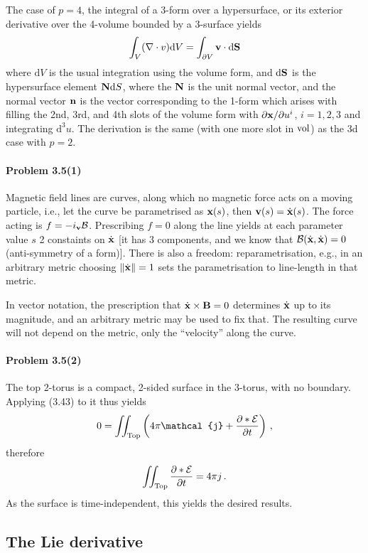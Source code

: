 \documentclass[a4paper,12pt]{article}
\def\d{\mathrm{d}}
\newcommand{\problem}[1]{\paragraph{Problem #1}}
\begin{document}
The case of $p=4$, the integral of a 3-form over a hypersurface, or its exterior derivative over the 4-volume bounded by a 3-surface yields
\[
 \int_{V}(\nabla \cdot v)\d V = \int_{\partial V}{\bf v}\cdot \d {\bf S}
\]
where $\d V$ is the usual integration using the volume form, and $\d{\bf S}$ is the hypersurface element ${\bf N}\d S$, where the ${\bf N}$ is the unit normal vector, and the normal vector ${\bf n}$ is the vector corresponding to the 1-form which arises with filling the 2nd, 3rd, and 4th slots of the volume form with $\partial{\bf x}/\partial u^i$, $i=1,2,3$ and integrating $\d^3 u$. The derivation is the same (with one more slot in ${\rm vol}$) as the 3d case with $p=2$.



\problem{3.5(1)} Magnetic field lines are curves, along which no magnetic force acts on a moving particle, i.e., let the curve be parametrised as ${\bf x}(s)$, then ${\bf v}(s) = \dot{\bf x}(s)$. The force acting is $f = -i_{\bf v}\mathcal{B}$. Prescribing $f=0$ along the line yields at each parameter value $s$ 2 constaints on $\dot{\bf x}$ [it has 3 components, and we know that $\mathcal{B}(\dot{\bf x}, \dot{\bf x})=0$ (anti-symmetry of a form)]. There is also a freedom: reparametrisation, e.g., in an arbitrary metric choosing $\|\dot{\bf x}\| =1$ sets the parametrisation to line-length in that metric.

In vector notation, the prescription that $\dot{\bf x}\times {\bf B} = 0$ determines $\dot{\bf x}$ up to its magnitude, and an arbitrary metric may be used to fix that. The resulting curve will not depend on the metric, only the ``velocity'' along the curve.


\problem{3.5(2)} The top 2-torus is a compact, 2-sided surface in the 3-torus, with no boundary. Applying (3.43) to it thus yields
\[
 0 = \iint_{\rm Top}\left( 4\pi\mathcal{j} + \frac{\partial *\mathcal{E}}{\partial t}\right)\,,
\]
therefore
\[
 \iint_{\rm Top} \frac{\partial *\mathcal{E}}{\partial t}  = 4\pi j\,.
\]
As the surface is time-independent, this yields the desired results.


\subsection{The Lie derivative}
\end{document}
